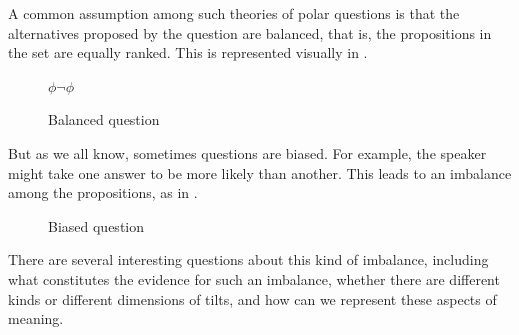 \documentclass[output=paper,colorlinks,citecolor=brown]{langscibook}
\begin{document}

A common assumption among such theories of polar questions is that the alternatives proposed by the question are balanced, that is, the propositions in the set are equally ranked. This is represented visually in .

\begin{figure}
\hspace{0.3cm}$\phi$\hspace{2.9cm}$\neg\phi$\\
\caption{Balanced question}
\label{balanced}
\end{figure}

But as we all know, sometimes questions are biased. For example, the speaker might take one answer to be more likely than another. This leads to an imbalance among the propositions, as in .

\begin{figure}
\caption{Biased question}
\label{unbalanced}
\end{figure}

There are several interesting questions about this kind of imbalance, including what constitutes the evidence for such an imbalance, whether there are different kinds or different dimensions of tilts, and how can we represent these aspects of meaning.


\end{document}
